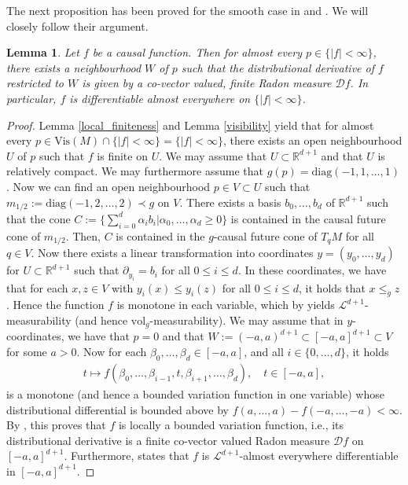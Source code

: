 \documentclass[a4paper,10pt]{article}
\newtheorem{lemma}[theorem]{Lemma}
\numberwithin{equation}{section}
\newcommand{\R}{\mathbb{R}}
\newcommand{\vol}{\mathrm{vol}}
\begin{document}
The next proposition has been proved for the smooth case in \cite[Theorem 1.19]{minguzzi2019lorentzian} and \cite[Theorem A.2]{beran2024nonlinear}. We will closely follow their argument.
\smallskip

\begin{lemma}\label{bounded_variation_neighbourhoods}
    Let $f$ be a causal function. 
    Then for almost every $p \in \{|f|<\infty\}$, there exists a neighbourhood $W$ of $p$ such that the distributional derivative of $f$ restricted to $W$ is given by a co-vector valued, finite Radon measure $\mathcal{D}f$.
    In particular,  $f$ is differentiable almost everywhere on $\{|f|<\infty\}$.
\end{lemma}
\begin{proof}
    Lemma \ref{local_finiteness} and Lemma \ref{visibility} yield that for almost every $p\in \mathrm{Vis}(M)\cap \{|f|<\infty\} = \{|f|<\infty\}$, there exists an open neighbourhood $U$ of $p$ such that $f$ is finite on $U$. We may assume that $U \subset \R^{d+1}$ and that $U$ is relatively compact. We may furthermore assume that $g(p)= \mathrm{diag}(-1, 1, \ldots, 1)$. 
    Now we can find an open neighbourhood $ p \in V\subset U$ such that $m_{1/2}:=\mathrm{diag}(-1, 2, \ldots, 2) \prec g$ on $V$. There exists a basis $b_0, \ldots, b_d$ of $\R^{d+1}$ such that the cone $C:=\{\sum_{i=0}^d \alpha_ib_i | \alpha_0, \ldots, \alpha_d \geq 0\}$ is contained in the causal future cone of $m_{1/2}$. Then, $C$ is contained in the $g$-causal future cone of $T_qM$ for all $q \in V$. Now there exists a linear transformation into coordinates $y = (y_0, \ldots, y_d)$ for $ U \subset \R^{d+1}$ such that $\partial_{y_i} = b_i$ for all $0 \leq i \leq d$.
    In these coordinates, we have that for each $x, z\in V$ with $y_i(x) \leq y_i(z)$ for  all $0 \leq i \leq d$, it holds that $x \leq_g z$. 
    Hence the function $f$ is monotone in each variable, which by \cite[Theorem 4]{chabrillac2009continuity} yields $\mathcal{L}^{d+1}$-measurability (and hence $\vol_g$-measurability). We may assume that in $y$-coordinates, we have that $p=0$ and that $ W:= (-a, a)^{d+1} \subset [-a, a]^{d+1} \subset V$ for some $a >0$. Now for each $\beta_0, \ldots, \beta_d \in [-a, a]$, and all $i \in \{0, \ldots, d\}$, it holds
    \begin{align*}
        t \mapsto f(\beta_0, \ldots, \beta_{i-1}, t, \beta_{i+1}, \ldots, \beta_d), \quad t \in [-a, a],
    \end{align*}
    is a monotone (and hence a bounded variation function in one variable) whose distributional differential is bounded above by $f(a, \ldots, a)-f(-a, \ldots, -a) < \infty$. By \cite[Remark 3.104]{ambrosio2000functions}, this proves that $f$ is locally a bounded variation function, i.e., its distributional derivative is a finite co-vector valued Radon measure $\mathcal{D}f$ on $[-a, a]^{d+1}$. Furthermore, \cite[Theorem 14]{chabrillac2009continuity} states that $f$ is $\mathcal{L}^{d+1}$-almost everywhere differentiable in $[-a, a]^{d+1}$. 
\end{proof}
\end{document}
